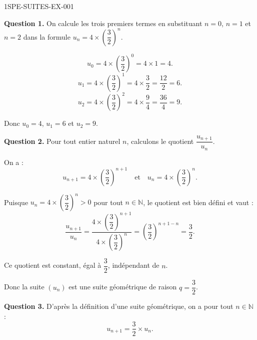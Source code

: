 \begin{corrige}{1SPE-SUITES-EX-001}


\textbf{Question 1.} On calcule les trois premiers termes en substituant $n = 0$, $n = 1$ et $n = 2$ dans la formule $u_n = 4 \times \left(\dfrac{3}{2}\right)^n$.

\[
u_0 = 4 \times \left(\frac{3}{2}\right)^0 = 4 \times 1 = 4.
\]
\[
u_1 = 4 \times \left(\frac{3}{2}\right)^1 = 4 \times \frac{3}{2} = \frac{12}{2} = 6.
\]
\[
u_2 = 4 \times \left(\frac{3}{2}\right)^2 = 4 \times \frac{9}{4} = \frac{36}{4} = 9.
\]

Donc $u_0 = 4$, $u_1 = 6$ et $u_2 = 9$.


\textbf{Question 2.} Pour tout entier naturel $n$, calculons le quotient $\dfrac{u_{n+1}}{u_n}$.

On a :
\[
u_{n+1} = 4 \times \left(\frac{3}{2}\right)^{n+1}
\quad \text{et} \quad
u_n = 4 \times \left(\frac{3}{2}\right)^n.
\]

Puisque $u_n = 4 \times \left(\dfrac{3}{2}\right)^n > 0$ pour tout $n \in \mathbb{N}$, le quotient est bien défini et vaut :
\[
\frac{u_{n+1}}{u_n} = \frac{4 \times \left(\dfrac{3}{2}\right)^{n+1}}{4 \times \left(\dfrac{3}{2}\right)^n} = \left(\frac{3}{2}\right)^{n+1-n} = \frac{3}{2}.
\]

Ce quotient est constant, égal à $\dfrac{3}{2}$, indépendant de $n$.

Donc la suite $(u_n)$ est une suite géométrique de raison $q = \dfrac{3}{2}$.


\textbf{Question 3.} D'après la définition d'une suite géométrique, on a pour tout $n \in \mathbb{N}$ :
\[
\boxed{u_{n+1} = \frac{3}{2} \times u_n.}
\]

\end{corrige}
